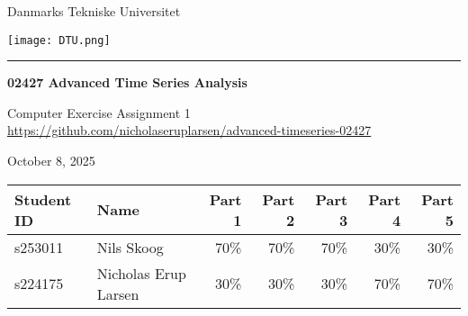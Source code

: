\begin{titlepage}
    \begin{center}
        \vspace*{1cm}
            
        \Huge{Danmarks Tekniske Universitet }
        \vspace*{1.5cm}

        \texttt{[image: DTU.png]}
            
        \vspace{1cm}
        \rule{12cm}{1pt}
        \vspace{.4cm}

        \LARGE
        \textbf{02427 Advanced Time Series Analysis}
        
        \vspace{.7cm}
        \Large Computer Exercise Assignment 1\\
        
        \normalsize
        \vspace{.3cm}
        \href{https://github.com/nicholaseruplarsen/advanced-timeseries-02427}{https://github.com/nicholaseruplarsen/advanced-timeseries-02427}
        
        
        \vspace{.3cm}
        October 8, 2025\\
        \vspace{1cm}

        \normalsize
        \begin{tabular}{llrrrrr}
            \hline
            Student ID & Name & Part 1 & Part 2 & Part 3 & Part 4 & Part 5\\
            \hline
            s253011 & Nils Skoog & 70\% & 70\% & 70\% & 30\% & 30\% \\
            s224175 & Nicholas Erup Larsen & 30\% & 30\% & 30\% & 70\% & 70\% \\
            \hline
        \end{tabular}
        
    \end{center}
\end{titlepage}

